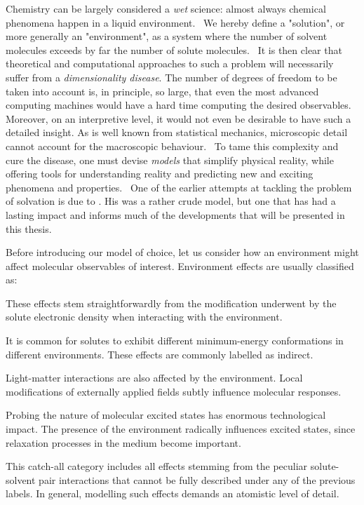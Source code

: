 Chemistry can be largely considered a \emph{wet} science: almost always
chemical phenomena happen in a liquid environment.~\autocite{Reichardt2010-le}
We hereby define a "solution", or more generally an "environment", as
a system where the number of solvent molecules exceeds by far the number
of solute molecules.~\autocite{Tomasi2004-dc, Tomasi2007-es}
It is then clear that theoretical and computational approaches to such a
problem will necessarily suffer from a \emph{dimensionality disease}.
The number of degrees of freedom to be taken into account is, in
principle, so large, that even the most advanced computing machines
would have a hard time computing the desired observables.
Moreover, on an interpretive level, it would not even be desirable to
have such a detailed insight.
As is well known from statistical mechanics, microscopic detail cannot
account for the macroscopic behaviour.~\autocite{Hill1960-ql,
Hansen2013-io}
To tame this complexity and cure the disease, one must devise
\emph{models} that simplify physical reality, while offering tools for
understanding reality and predicting new and exciting
phenomena and properties.~\autocite{Anderson1972-ai, Winsberg2010-sy, Kovac2011-ew}
One of the earlier attempts at tackling the problem of solvation is due
to \citeauthor{Onsager1936-wf}. His was a rather crude model, but one
that has had a lasting impact and informs much of the developments that
will be presented in this thesis.~\autocite{Onsager1936-wf}

Before introducing our model of choice, let us consider how an
environment might affect molecular observables of interest.
Environment effects are usually classified as:
\begin{description}[font=\normalfont\scshape]
\item[Direct.]
  These effects stem straightforwardly from the modification underwent by
  the solute electronic density when interacting with the environment.
\item[Indirect.]
  It is common for solutes to exhibit different minimum-energy
  conformations in different environments. These effects are commonly
  labelled as indirect.
\item[Local field.]
  Light-matter interactions are also affected by the environment. Local
  modifications of externally applied fields subtly influence molecular
  responses.~\autocite{Cammi1998-jp, Pipolo2014-sd}
\item[Dynamic.]
  Probing the nature of molecular excited states has enormous
  technological impact. The presence of the environment radically
  influences excited states, since relaxation processes in the medium
  become important.
\item[Specific.] This catch-all category includes all effects
  stemming from the peculiar solute-solvent pair interactions that
  cannot be fully described under any of the previous labels.
  In general, modelling such effects demands an atomistic level of
  detail.
\end{description}

